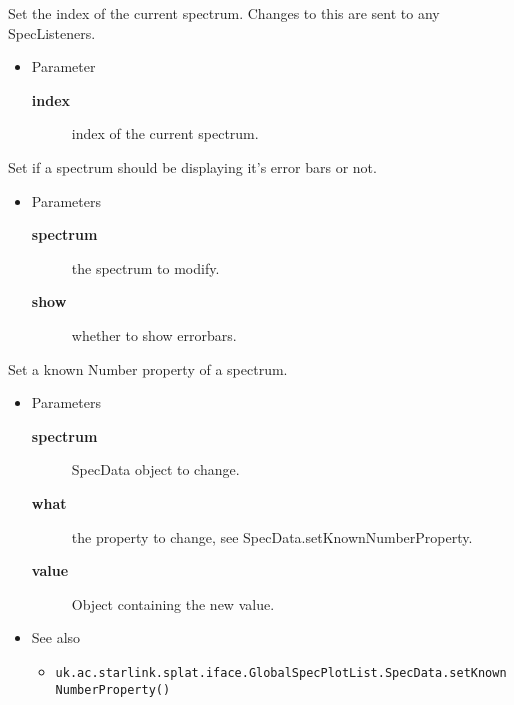\begin{desc}Set the index of the current spectrum. Changes to this are
 sent to any SpecListeners.
\begin{itemize}
\item{Parameter
  \begin{description}
   \item[\textbf{index}]{index of the current spectrum.}
  \end{description}}
\end{itemize}
\end{desc}

\begin{desc}Set if a spectrum should be displaying it's error bars or
  not.
\begin{itemize}
\item{Parameters
  \begin{description}
   \item[\textbf{spectrum}]{the spectrum to modify.}
   \item[\textbf{show}]{whether to show errorbars.}
  \end{description}}
\end{itemize}
\end{desc}

\begin{desc}Set a known Number property of a spectrum.
\begin{itemize}
\item{Parameters
  \begin{description}
   \item[\textbf{spectrum}]{SpecData object to change.}
   \item[\textbf{what}]{the property to change, see
               SpecData.setKnownNumberProperty.}
   \item[\textbf{value}]{Object containing the new value.}
  \end{description}}
\end{itemize}
\begin{itemize}
\item{{See also}
  \begin{itemize}
   \item{\texttt{uk.ac.starlink.splat.iface.GlobalSpecPlotList.SpecData.setKnownNumberProperty()} {
}
}
  \end{itemize}
}
\end{itemize}
\end{desc}

